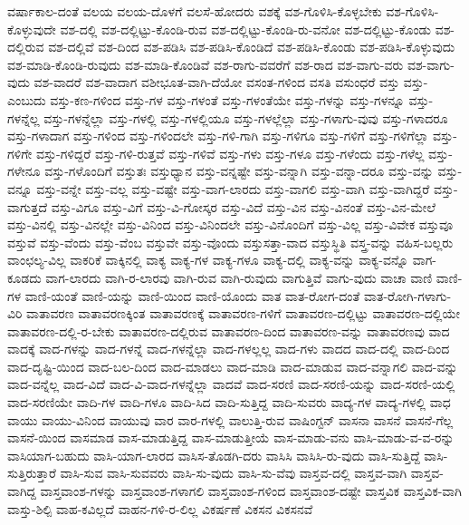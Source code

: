 {ವರ್ಷಾಕಾಲ-ದಂತೆ
ವಲಯ
ವಲಯ-ದೊಳಗೆ
ವಲಸೆ-ಹೋದರು
ವಶಕ್ಕೆ
ವಶ-ಗೊಳಿಸಿ-ಕೊಳ್ಳಬೇಕು
ವಶ-ಗೊಳಿಸಿ-ಕೊಳ್ಳುವುದೇ
ವಶ-ದಲ್ಲಿ
ವಶ-ದಲ್ಲಿಟ್ಟು-ಕೊಂಡಿ-ರುವ
ವಶ-ದಲ್ಲಿಟ್ಟು-ಕೊಂಡಿ-ರು-ವನೋ
ವಶ-ದಲ್ಲಿಟ್ಟು-ಕೊಂಡು
ವಶ-ದಲ್ಲಿರುವ
ವಶ-ದಲ್ಲಿವೆ
ವಶ-ದಿಂದ
ವಶ-ಪಡಿಸಿ
ವಶ-ಪಡಿಸಿ-ಕೊಂಡಿದೆ
ವಶ-ಪಡಿಸಿ-ಕೊಂಡು
ವಶ-ಪಡಿಸಿ-ಕೊಳ್ಳುವುದು
ವಶ-ಮಾಡಿ-ಕೊಂಡಿ-ರುವುದು
ವಶ-ಮಾಡಿ-ಕೊಂಡಿವೆ
ವಶ-ರಾಗು-ವವರೆಗೆ
ವಶ-ರಾದ
ವಶ-ವಾಗು-ವರು
ವಶ-ವಾಗು-ವುದು
ವಶ-ವಾದರೆ
ವಶ-ವಾದಾಗ
ವಶೀಭೂತ-ವಾಗಿ-ದೆಯೋ
ವಸಂತ-ಗಳಿಂದ
ವಸತಿ
ವಸುಂಧರೆ
ವಸ್ತು
ವಸ್ತು-ಎಂಬುದು
ವಸ್ತು-ಕಣ-ಗಳಿಂದ
ವಸ್ತು-ಗಳ
ವಸ್ತು-ಗಳಂತೆ
ವಸ್ತು-ಗಳಂತೆಯೇ
ವಸ್ತು-ಗಳನ್ನು
ವಸ್ತು-ಗಳನ್ನೂ
ವಸ್ತು-ಗಳನ್ನೆಲ್ಲ
ವಸ್ತು-ಗಳನ್ನೆಲ್ಲಾ
ವಸ್ತು-ಗಳಲ್ಲಿ
ವಸ್ತು-ಗಳಲ್ಲಿಯೂ
ವಸ್ತು-ಗಳಲ್ಲೆಲ್ಲಾ
ವಸ್ತು-ಗಳಾಗು-ವುವು
ವಸ್ತು-ಗಳಾದರೂ
ವಸ್ತು-ಗಳಾದಾಗ
ವಸ್ತು-ಗಳಿಂದ
ವಸ್ತು-ಗಳಿಂದಲೇ
ವಸ್ತು-ಗಳಿ-ಗಾಗಿ
ವಸ್ತು-ಗಳಿಗೂ
ವಸ್ತು-ಗಳಿಗೆ
ವಸ್ತು-ಗಳಿಗೆಲ್ಲಾ
ವಸ್ತು-ಗಳಿಗೇ
ವಸ್ತು-ಗಳಿದ್ದರೆ
ವಸ್ತು-ಗಳಿ-ರುತ್ತವೆ
ವಸ್ತು-ಗಳಿವೆ
ವಸ್ತು-ಗಳು
ವಸ್ತು-ಗಳೂ
ವಸ್ತು-ಗಳೆಂದು
ವಸ್ತು-ಗಳೆಲ್ಲ
ವಸ್ತು-ಗಳೇನೂ
ವಸ್ತು-ಗಳೊಂದಿಗೆ
ವಸ್ತುತಃ
ವಸ್ತುಧ್ಯಾನ
ವಸ್ತು-ವನ್ನಷ್ಟೇ
ವಸ್ತು-ವನ್ನಾಗಿ
ವಸ್ತು-ವನ್ನಾ-ದರೂ
ವಸ್ತು-ವನ್ನು
ವಸ್ತು-ವನ್ನೂ
ವಸ್ತು-ವನ್ನೇ
ವಸ್ತು-ವಲ್ಲ
ವಸ್ತು-ವಷ್ಟೇ
ವಸ್ತು-ವಾಗ-ಲಾರದು
ವಸ್ತು-ವಾಗಲಿ
ವಸ್ತು-ವಾಗಿ
ವಸ್ತು-ವಾಗಿದ್ದರೆ
ವಸ್ತು-ವಾಗುತ್ತದೆ
ವಸ್ತು-ವಿಗೂ
ವಸ್ತು-ವಿಗೆ
ವಸ್ತು-ವಿ-ಗೋಸ್ಕರ
ವಸ್ತು-ವಿದೆ
ವಸ್ತು-ವಿನ
ವಸ್ತು-ವಿನಂತೆ
ವಸ್ತು-ವಿನ-ಮೇಲೆ
ವಸ್ತು-ವಿನಲ್ಲಿ
ವಸ್ತು-ವಿನಲ್ಲೇ
ವಸ್ತು-ವಿನಿಂದ
ವಸ್ತು-ವಿನಿಂದಲೇ
ವಸ್ತು-ವಿನೊಂದಿಗೆ
ವಸ್ತು-ವಿಲ್ಲ
ವಸ್ತು-ವಿವೇಕ
ವಸ್ತುವೂ
ವಸ್ತುವೆ
ವಸ್ತು-ವೆಂದು
ವಸ್ತು-ವೆಂಬ
ವಸ್ತುವೇ
ವಸ್ತು-ವೊಂದು
ವಸ್ತುಸತ್ತಾ-ವಾದ
ವಸ್ತುಸ್ಥಿತಿ
ವಸ್ತ್ರ-ವನ್ನು
ವಹಿಸ-ಬಲ್ಲರು
ವಾಂಛಲ್ಯ-ವಿಲ್ಲ
ವಾಕರಿಕೆ
ವಾಕ್ಕಿನಲ್ಲಿ
ವಾಕ್ಯ
ವಾಕ್ಯ-ಗಳ
ವಾಕ್ಯ-ಗಳೂ
ವಾಕ್ಯ-ದಲ್ಲಿ
ವಾಕ್ಯ-ವನ್ನು
ವಾಕ್ಯ-ವನ್ನೊ
ವಾಗ-ಕೂಡದು
ವಾಗ-ಲಾರದು
ವಾಗಿ-ರ-ಲಾರವು
ವಾಗಿ-ರುವ
ವಾಗಿ-ರುವುದು
ವಾಗುತ್ತಿವೆ
ವಾಗು-ವುದು
ವಾಚಾ
ವಾಣಿ
ವಾಣಿ-ಗಳ
ವಾಣಿ-ಯಂತೆ
ವಾಣಿ-ಯನ್ನು
ವಾಣಿ-ಯಿಂದ
ವಾಣಿ-ಯೊಂದು
ವಾತ
ವಾತ-ರೋಗ-ದಂತೆ
ವಾತ-ರೋಗಿ-ಗಳಾಗು-ವಿರಿ
ವಾತಾವರಣ
ವಾತಾವರಣಕ್ಕಿಂತ
ವಾತಾವರಣಕ್ಕೆ
ವಾತಾವರಣ-ಗಳಿಗೆ
ವಾತಾವರಣ-ದಲ್ಲಿಟ್ಟು
ವಾತಾವರಣ-ದಲ್ಲಿಯೇ
ವಾತಾವರಣ-ದಲ್ಲಿ-ರ-ಬೇಕು
ವಾತಾವರಣ-ದಲ್ಲಿರುವ
ವಾತಾವರಣ-ದಿಂದ
ವಾತಾವರಣ-ವನ್ನು
ವಾತಾವರಣವು
ವಾದ
ವಾದಕ್ಕೆ
ವಾದ-ಗಳನ್ನು
ವಾದ-ಗಳನ್ನೆ
ವಾದ-ಗಳನ್ನೆಲ್ಲಾ
ವಾದ-ಗಳಲ್ಲಲ್ಲ
ವಾದ-ಗಳು
ವಾದದ
ವಾದ-ದಲ್ಲಿ
ವಾದ-ದಿಂದ
ವಾದ-ದೃಷ್ಟಿ-ಯಿಂದ
ವಾದ-ಬಲ-ದಿಂದ
ವಾದ-ಮಾಡಲು
ವಾದ-ಮಾಡಿ
ವಾದ-ಮಾಡುವ
ವಾದ-ವನ್ನಾಗಲಿ
ವಾದ-ವನ್ನು
ವಾದ-ವನ್ನೆಲ್ಲ
ವಾದ-ವಿದೆ
ವಾದ-ವಿ-ವಾದ-ಗಳನ್ನೆಲ್ಲಾ
ವಾದವೆ
ವಾದ-ಸರಣಿ
ವಾದ-ಸರಣಿ-ಯನ್ನು
ವಾದ-ಸರಣಿ-ಯಲ್ಲಿ
ವಾದ-ಸರಣಿಯೇ
ವಾದಿ-ಗಳ
ವಾದಿ-ಗಳೂ
ವಾದಿ-ಸಿದ
ವಾದಿ-ಸುತ್ತಿದ್ದ
ವಾದಿ-ಸುವರು
ವಾದ್ಯ-ಗಳ
ವಾದ್ಯ-ಗಳಲ್ಲಿ
ವಾಧ
ವಾಯು
ವಾಯು-ವಿನಿಂದ
ವಾಯುವು
ವಾರ
ವಾರ-ಗಳಲ್ಲಿ
ವಾಲುತ್ತಿ-ರುವ
ವಾಷಿಂಗ್ಟನ್
ವಾಸನಾ
ವಾಸನೆ
ವಾಸನೆ-ಗೆಲ್ಲ
ವಾಸನೆ-ಯಿಂದ
ವಾಸಮಾಡ
ವಾಸ-ಮಾಡುತ್ತಿದ್ದ
ವಾಸ-ಮಾಡುತ್ತೀಯೆ
ವಾಸ-ಮಾಡು-ವನು
ವಾಸಿ-ಮಾಡು-ವ-ವ-ರನ್ನು
ವಾಸಿಯಾಗ-ಬಹುದು
ವಾಸಿ-ಯಾಗ-ಲಾರದ
ವಾಸಿಸ-ತೊಡಗಿ-ದರು
ವಾಸಿಸಿ
ವಾಸಿಸಿ-ರು-ವುದು
ವಾಸಿ-ಸುತ್ತಿದ್ದೆ
ವಾಸಿ-ಸುತ್ತಿರುತ್ತಾರೆ
ವಾಸಿ-ಸುವ
ವಾಸಿ-ಸುವವರು
ವಾಸಿ-ಸು-ವುದು
ವಾಸಿ-ಸು-ವೆವು
ವಾಸ್ತವ-ದಲ್ಲಿ
ವಾಸ್ತವ-ವಾಗಿ
ವಾಸ್ತವ-ವಾಗಿದ್ದ
ವಾಸ್ತವಾಂಶ-ಗಳನ್ನು
ವಾಸ್ತವಾಂಶ-ಗಳಾಗಲಿ
ವಾಸ್ತವಾಂಶ-ಗಳಿಂದ
ವಾಸ್ತವಾಂಶ-ದಷ್ಟೇ
ವಾಸ್ತವಿಕ
ವಾಸ್ತವಿಕ-ವಾಗಿ
ವಾಸ್ತು-ಶಿಲ್ಪಿ
ವಾಹ-ಕವಿಲ್ಲದೆ
ವಾಹನ-ಗಳಿ-ರ-ಲಿಲ್ಲ
ವಿಕರ್ಷಣೆ
ವಿಕಸನ
ವಿಕಸನವೆ
}
